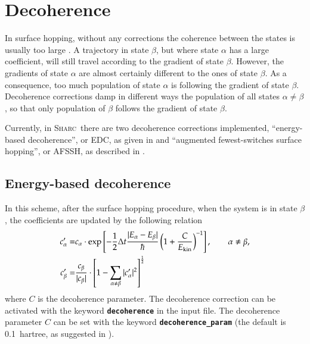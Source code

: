 \documentclass[a4paper,10pt,DIV=15,openany]{scrbook}
\newcommand{\sharc}{\textsc{Sharc}}
\newcommand{\ttt}[1]{\textbf{\texttt{#1}}}
\begin{document}

\section{Decoherence}\label{met:decoherence}

In surface hopping, without any corrections the coherence between the states is usually too large \cite{Granucci2007JCP}. A trajectory in state $\beta$, but where state $\alpha$ has a large coefficient, will still travel according to the gradient of state $\beta$. However, the gradients of state $\alpha$ are almost certainly different to the ones of state $\beta$. As a consequence, too much population of state $\alpha$ is following the gradient of state $\beta$. Decoherence corrections damp in different ways the population of all states $\alpha\neq\beta$, so that only population of $\beta$ follows the gradient of state $\beta$.

Currently, in \sharc\ there are two decoherence corrections implemented, ``energy-based decoherence'', or EDC, as given in \cite{Granucci2010JCP} and ``augmented fewest-switches surface hopping'', or AFSSH, as described in \cite{Jain2016JCTC}.

\subsection{Energy-based decoherence}

In this scheme, after the surface hopping procedure, when the system is in state $\beta$, the coefficients are updated by the following relation
\begin{align}
  c_\alpha^\prime=&
  c_\alpha\cdot\exp
  \left[
    -\frac{1}{2}\Delta t\frac{|E_\alpha-E_\beta|}{\hbar}
    \left(
      1+\frac{C}{E_{\text{kin}}}
    \right)^{-1}
  \right],\qquad \alpha\neq\beta,\\
  c_\beta^\prime=&
  \frac{c_\beta}{|c_\beta|}\cdot
  \left[
    1-\sum\limits_{\alpha\neq\beta}^{\vphantom{\alpha}} |c^\prime_\alpha|^2
  \right]^{\frac{1}{2}}
\end{align}
where $C$ is the decoherence parameter. The decoherence correction can be activated with the keyword \ttt{decoherence} in the input file. The decoherence parameter $C$ can be set with the keyword \ttt{decoherence\_param} (the default is 0.1~hartree, as suggested in \cite{Granucci2010JCP}).
\end{document}
